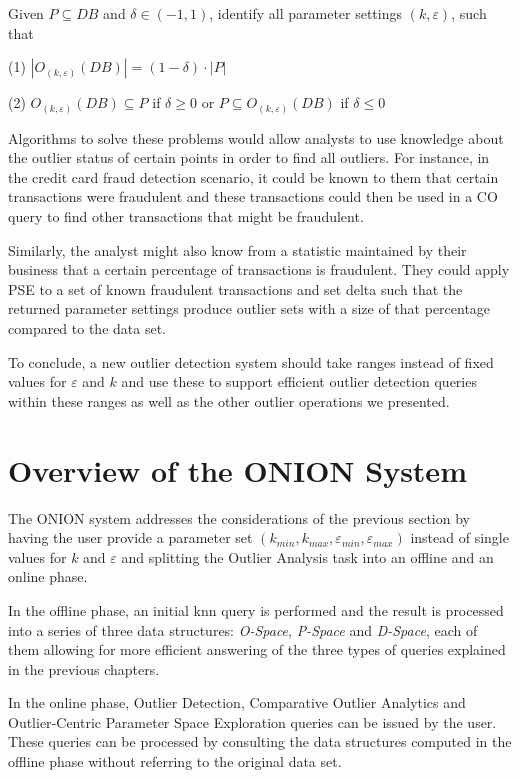 \documentclass[runningheads]{llncs}
\begin{document}
\begin{definition}

\noindent Given $P\subseteq DB$ and $\delta \in (-1,1)$, identify all parameter settings $(k,\varepsilon)$, such that

\noindent(1) $|O_{(k,\varepsilon)}(DB)| = (1 - \delta) \cdot |P|$

\noindent(2) $O_{(k,\varepsilon)}(DB) \subseteq P$ if $\delta \geq 0$ or $P \subseteq O_{(k,\varepsilon)}(DB)$ if $\delta \leq 0$
\end{definition}

Algorithms to solve these problems would allow analysts to use knowledge about the outlier status of certain points in order to find all outliers. For instance, in the credit card fraud detection scenario, it could be known to them that certain transactions were fraudulent and these transactions could then be used in a CO query to find other transactions that might be fraudulent.

Similarly, the analyst might also know from a statistic maintained by their business that a certain percentage of transactions is fraudulent. They could apply PSE to a set of known fraudulent transactions and set delta such that the returned parameter settings produce outlier sets with a size of that percentage compared to the data set.

To conclude, a new outlier detection system should take ranges instead of fixed values for $\varepsilon$ and $k$ and use these to support efficient outlier detection queries within these ranges as well as the other outlier operations we presented.
\section{Overview of the ONION System}
The ONION\cite{onion} system  addresses the considerations of the previous section by having the user provide a parameter set $(k_{min},k_{max},\varepsilon_{min},\varepsilon_{max})$ instead of single values for $k$ and $\varepsilon$ and splitting the Outlier Analysis task into an offline and an online phase.

In the offline phase, an initial knn query is performed and the result is processed into a series of three data structures: \emph{O-Space}, \emph{P-Space} and \emph{D-Space}, each of them allowing for more efficient answering of the three types of queries explained in the previous chapters.

In the online phase, Outlier Detection, Comparative Outlier Analytics and Outlier-Centric Parameter Space Exploration queries can be issued by the user. These queries can be processed by consulting the data structures computed in the offline phase without referring to the original data set.
\end{document}

